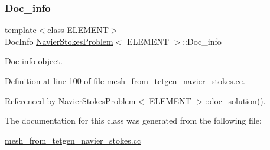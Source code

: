 \subsubsection{\texorpdfstring{Doc\+\_\+info}{Doc\_info}}
{\footnotesize\ttfamily template$<$class E\+L\+E\+M\+E\+NT$>$ \\
Doc\+Info \hyperlink{classNavierStokesProblem}{Navier\+Stokes\+Problem}$<$ E\+L\+E\+M\+E\+NT $>$\+::Doc\+\_\+info\hspace{0.3cm}{\ttfamily [private]}}



Doc info object. 



Definition at line 100 of file mesh\+\_\+from\+\_\+tetgen\+\_\+navier\+\_\+stokes.\+cc.



Referenced by Navier\+Stokes\+Problem$<$ E\+L\+E\+M\+E\+N\+T $>$\+::doc\+\_\+solution().



The documentation for this class was generated from the following file\+:\begin{DoxyCompactItemize}
\item 
\hyperlink{mesh__from__tetgen__navier__stokes_8cc}{mesh\+\_\+from\+\_\+tetgen\+\_\+navier\+\_\+stokes.\+cc}\end{DoxyCompactItemize}
